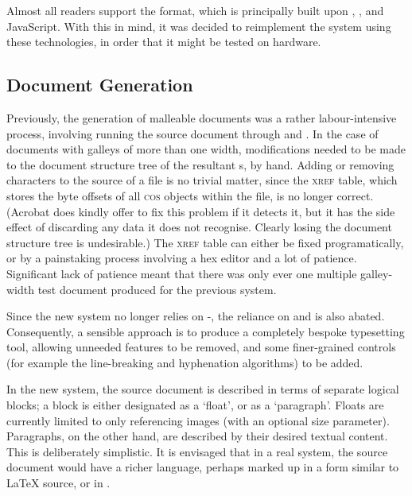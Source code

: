 Almost all \ebook{} readers support the \epub{} format, which is principally built upon \html{}, \css{}, and JavaScript. With this in mind, it was decided to reimplement the system using these technologies, in order that it might be tested on \ebook{} hardware. 



\subsection{Document Generation}
\label{sec:docgen}




Previously, the generation of malleable documents was a rather labour-intensive process, involving running the source document through \troff{} and \pdfdit{}. In the case of documents with galleys of more than one width, modifications needed to be made to the document structure tree of the resultant \pdf{}s, by hand. Adding or removing characters to the source of a \pdf{} file is no trivial matter, since the \textsc{xref} table, which stores the byte offsets of all \textsc{cos} objects within the file, is no longer correct. (Acrobat does kindly offer to fix this problem if it detects it, but it has the side effect of discarding any data it does not recognise. Clearly losing the document structure tree is undesirable.) The \textsc{xref} table can either be fixed programatically, or by a painstaking process involving a hex editor and a lot of patience. Significant lack of patience meant that there was only ever one multiple galley-width test document produced for the previous system.

Since the new system no longer relies on \COG{}-\pdf{}, the reliance on \troff{} and \pdfdit{} is also abated. Consequently, a sensible approach is to produce a completely bespoke typesetting tool, allowing unneeded features to be removed, and some finer-grained controls (for example the line-breaking and hyphenation algorithms) to be added.



In the new system, the source document is described in terms of separate logical blocks; a block is either designated as a `float', or as a `paragraph'. Floats are currently limited to only referencing images (with an optional size parameter). Paragraphs, on the other hand, are described by their desired textual content. This is deliberately simplistic. It is envisaged that in a real system, the source document would have a richer language, perhaps marked up in a form similar to \LaTeX{} source, or in \xml{}.

